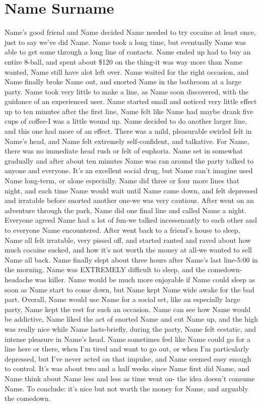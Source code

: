 \documentclass[12pt]{book}
\begin{document}
\chapter{Name Surname}

Name's good friend and Name decided Name needed to try cocaine at least once, just to say we've did Name. Name took a long time, but eventually Name was able to get some through a long line of contacts. Name ended up had to buy an entire 8-ball, and spent about \$120 on the thing-it was way more than Name wanted, Name still have alot left over. Name waited for the right occasion, and Name finally broke Name out, and snorted Name in the bathroom at a large party. Name took very little to make a line, as Name soon discovered, with the guidance of an experienced user. Name started small and noticed very little effect up to ten minutes after the first line, Name felt like Name had maybe drank five cups of coffee-I was a little wound up. Name decided to do another larger line, and this one had more of an effect. There was a mild, pleasurable swirled felt in Name's head, and Name felt extremely self-confident, and talkative. For Name, there was no immediate head rush or felt of euphoria. Name set in somewhat gradually and after about ten minutes Name was ran around the party talked to anyone and everyone. It's an excellent social drug, but Name can't imagine used Name long-term, or alone especially. Name did three or four more lines that night, and each time Name would wait until Name came down, and felt depressed and irratable before snorted another one-we was very cautious. After went on an adventure through the park, Name did one final line and called Name a night. Everyone agreed Name had a lot of fun-we talked incessenantly to each other and to everyone Name encountered. After went back to a friend's house to sleep, Name all felt irratable, very pissed off, and started ranted and raved about how much cocaine sucked, and how it's not worth the money at all-we wanted to sell Name all back. Name finally slept about three hours after Name's last line-5:00 in the morning. Name was EXTREMELY difficult to sleep, and the comedown-headache was killer. Name would be much more enjoyable if Name could sleep as soon as Name start to come down, but Name kept Name wide awake for the bad part. Overall, Name would use Name for a social set, like an especially large party, Name kept the rest for such an occasion. Name can see how Name would be addictive, Name liked the act of snorted Name and cut Name up, and the high was really nice while Name lasts-briefly, during the party, Name felt ecstatic, and intense pleasure in Name's head. Name sometimes feel like Name could go for a line here or there, when I'm tired and want to go out, or when I'm particularly depressed, but I've never acted on that impulse, and Name seemed easy enough to control. It's was about two and a half weeks since Name first did Name, and Name think about Name less and less as time went on- the idea doesn't consume Name. To conclude: it's nice but not worth the money for Name, and arguably the comedown.
\end{document}
